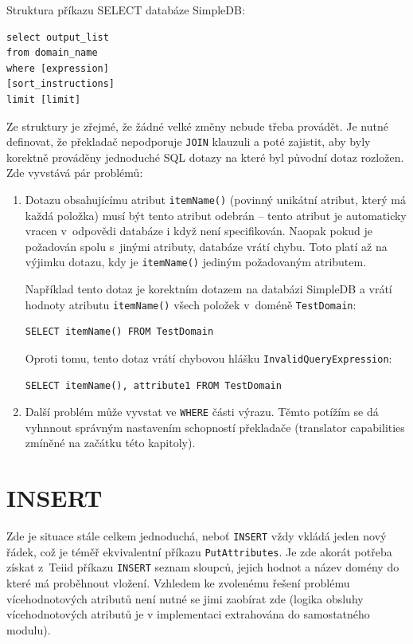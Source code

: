 \documentclass[oneside,12pt]{fithesis2}
\begin{document}
Struktura příkazu SELECT databáze SimpleDB:
\begin{Verbatim}[frame=leftline,fontsize=\small]
select output_list
from domain_name
where [expression]
[sort_instructions]
limit [limit] 
\end{Verbatim}
Ze struktury je zřejmé, že žádné velké změny nebude třeba provádět. Je nutné definovat, že překladač nepodporuje \verb<JOIN< klauzuli a poté zajistit, aby byly korektně prováděny jednoduché SQL dotazy na které byl původní dotaz rozložen. Zde vyvstává pár problémů:
\begin{enumerate}
 \item Dotazu obsahujícímu atribut \verb<itemName()< (povinný unikátní atribut, který má každá položka) musí být tento atribut odebrán -- tento atribut je automaticky vracen v~odpovědi databáze i když není specifikován. Naopak pokud je požadován spolu s~jinými atributy, databáze vrátí chybu. Toto platí až na výjimku dotazu, kdy je \verb<itemName()< jediným požadovaným atributem.
 
 Například tento dotaz je korektním dotazem na databázi SimpleDB a vrátí hodnoty atributu \verb<itemName()< všech položek v~doméně \verb<TestDomain<:
 \begin{Verbatim}[fontsize=\small]
SELECT itemName() FROM TestDomain
  \end{Verbatim}
 Oproti tomu, tento dotaz vrátí chybovou hlášku \verb<InvalidQueryExpression<:
  \begin{Verbatim}[fontsize=\small]
SELECT itemName(), attribute1 FROM TestDomain
  \end{Verbatim}
 \item Další problém může vyvstat ve \texttt{WHERE} části výrazu. Těmto potížím se dá vyhnnout správným nastavením schopností překladače (translator capabilities zmíněné na začátku této kapitoly). 
\end{enumerate}

\section{INSERT}
Zde je situace stále celkem jednoduchá, neboť \verb<INSERT< vždy vkládá jeden nový řádek, což je téměř ekvivalentní příkazu \verb<PutAttributes<. Je zde akorát potřeba získat z~Teiid příkazu \verb<INSERT< seznam sloupců, jejich hodnot a název domény do které má proběhnout vložení. Vzhledem ke zvolenému řešení problému vícehodnotových atributů není nutné se jimi zaobírat zde (logika obsluhy vícehodnotových atributů je v implementaci extrahována do samostatného modulu).
\end{document}
